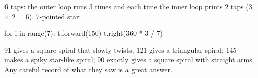 \begin{answer}
\textbf{6} taps: the outer loop runs 3 times and each time the inner loop prints 2 taps (3 × 2 = 6).
7-pointed star:
\begin{pycode}
for i in range(7):
    t.forward(150)
    t.right(360 * 3 / 7)
\end{pycode}
\end{answer}

\begin{answer}
91 gives a square spiral that slowly twists; 121 gives a triangular spiral; 145 makes a spiky star-like spiral; 90 exactly gives a square spiral with straight arms. Any careful record of what they saw is a great answer.
\end{answer}
